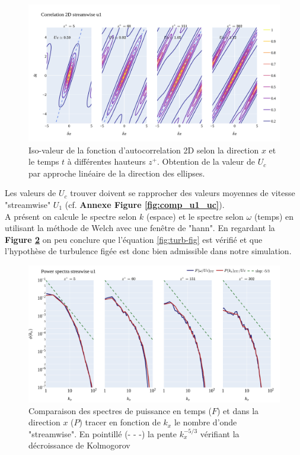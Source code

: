 \documentclass[12pt]{article}
\theoremstyle{plain}
\theoremstyle{remark}
\begin{document}
\begin{figure}[H]
	\begin{center}
		\includegraphics[width=0.9\linewidth]{../../output/figures/channel_wrles_retau395/split_time/frozen_turbulence/correlation2D/u1.png}
		\caption{Iso-valeur de la fonction d'autocorrelation 2D selon la direction $x$ et le temps $t$ à différentes hauteurs $z^+$. Obtention de la valeur de $U_c$ par approche linéaire de la direction des ellipses.}
		\label{fig:corr-2d}
	\end{center}
\end{figure}

Les valeurs de $U_c$ trouver doivent se rapprocher des valeurs moyennes de vitesse "streamwise" $U_1$ (cf. {\bf Annexe Figure \ref{fig:comp_u1_uc}}).\\

A présent on calcule le spectre selon $k$ (espace) et le spectre
selon $\omega$ (temps) en utilisant la méthode de Welch \cite{welch1967spectra} avec une fenêtre de "hann". En regardant la {\bf Figure \ref{fig:spectra-space-time}} on peu conclure que l'équation \ref{fig:turb-fig} est vérifié et que l'hypothèse de turbulence figée est donc bien admissible dans notre simulation.

\begin{figure}[H]
	\begin{center}
		\includegraphics[width=0.85\linewidth]{../../output/figures/channel_wrles_retau395/split_time/frozen_turbulence/power_spectra/u1.png}
		\caption{Comparaison des spectres de puissance en temps ($F$) et dans la direction $x$ ($P$) tracer en fonction de $k_x$ le nombre d'onde "streamwise". En pointillé (- - -) la pente $k_x^{-5/3}$ vérifiant la décroissance de Kolmogorov \cite{kolmogorov1991local}}
		\label{fig:spectra-space-time}
	\end{center}
\end{figure}
\end{document}
